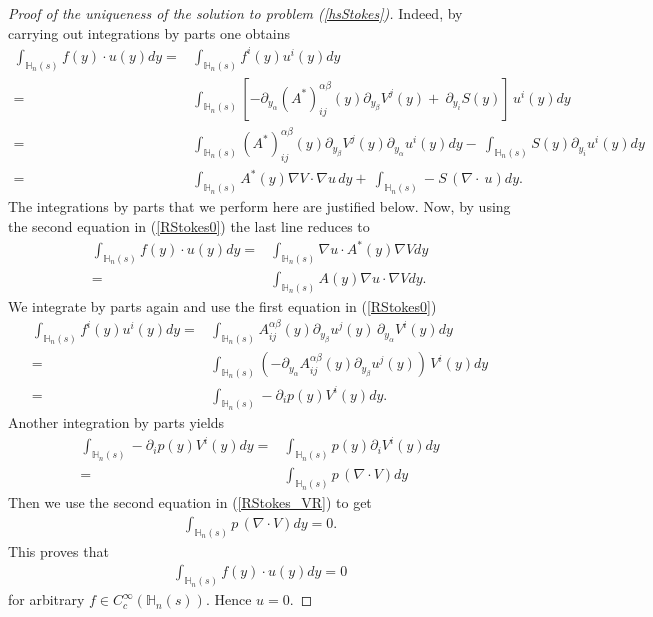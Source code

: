 \documentclass[11pt, reqno]{amsart}
\theoremstyle{definition}
\theoremstyle{remark}
\numberwithin{equation}{section}
\begin{document}
\begin{appendices}
\begin{proof}[Proof of the uniqueness of the solution to problem \textup{(\ref{hsStokes})}]
		\noindent Indeed, by carrying out integrations by parts one obtains
		\begin{align*}
			\int_{ \mathbb{H}_n(s)  }f(y)\cdot u(y) dy=&	\int_{ \mathbb{H}_n(s)}   f^i(y) u^i(y) dy\\ = &	\int_{ \mathbb{H}_n(s)  }[-\partial_{y_\alpha} (A^*)^{\alpha\beta}_{ij}(y) \partial_{y_\beta} V^j(y)  + \:  \partial_{y_i}S (y)]\,  u^i(y) dy\\
			= &	\int_{ \mathbb{H}_n(s)  } (A^*)^{\alpha\beta}_{ij}(y) \partial_{y_\beta} V^j(y)\partial_{y_\alpha}u^i(y)   dy - \: \int_{ \mathbb{H}_n(s)  } S (y) \partial_{y_i} u^i(y) dy\\
			=&	\int_{ \mathbb{H}_n(s) }  A^* (y) \nabla V\cdot \nabla u \, dy + \:\int_{  \mathbb{H}_n(s) } -S \, (\nabla \cdot \ \!   u) dy.
		\end{align*}
			\noindent	The integrations by parts that we perform here are justified below.
		Now, by using the second equation in (\ref{RStokes0}) the last line reduces to 
		\begin{align*}
			\int_{ \mathbb{H}_n(s) }f(y)\cdot u(y) dy
			=&	\int_{ \mathbb{H}_n(s) } \nabla u\cdot A^* (y) \nabla V dy\\
			=&	\int_{  \mathbb{H}_n(s) } A(y)\nabla u\cdot  \nabla V dy.
		\end{align*}
		We integrate by parts again and use the first equation in (\ref{RStokes0})
		\begin{align*}
			\int_{ \mathbb{H}_n(s)  }f^i(y) u^i(y) dy=&	\int_{  \mathbb{H}_n(s) }    A^{\alpha\beta}_{ij}(y) \partial_{y_\beta} u^j(y)\, \partial_{y_\alpha}\! V^i(y) dy\\
			=& \int_{  \mathbb{H}_n(s) } (- \partial_{y_\alpha}\! A^{\alpha\beta}_{ij}(y) \partial_{y_\beta} u^j(y))\,  V^i(y)  dy\\
			=& \int_{ \mathbb{H}_n(s) } - \partial_i p(y) V^i(y) dy.
		\end{align*}
		Another integration by parts yields
		\begin{align*}
			\int_{ \mathbb{H}_n(s) } - \partial_i p(y) V^i(y) dy=& \int_{ \mathbb{H}_n(s) }   p(y)\partial_i V^i(y) dy\\
			=&\int_{  \mathbb{H}_n(s) }  p\,  (\nabla \cdot V )dy
		\end{align*}
		Then we use the second equation in (\ref{RStokes_VR}) to get
		\begin{align*}
			\int_{ \mathbb{H}_n(s) }  p \,  (\nabla \cdot  V )dy=0.
		\end{align*}
		This proves that 
		\begin{align*}
			\int_{ \mathbb{H}_n(s) }f(y)\cdot u(y) dy=0
		\end{align*}
		for arbitrary $f\in C^\infty_c( \mathbb{H}_n(s) )$. Hence $u=0$.
	\end{proof}


\end{appendices}
\end{document}

